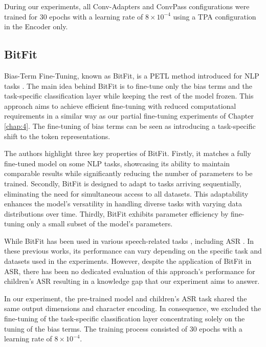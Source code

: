 During our experiments, all Conv-Adapters and ConvPass configurations were trained for 30 epochs with a learning rate of $8 \times 10^{-4}$ using a \ac{TPA} configuration in the Encoder only.


\subsection{BitFit}
Bias-Term Fine-Tuning, known as BitFit, is a \ac{PETL} method introduced for \ac{NLP} tasks \cite{ben-zaken-etal-2022-bitfit}. The main idea behind BitFit is to fine-tune only the bias terms and the task-specific classification layer while keeping the rest of the model frozen. This approach aims to achieve efficient fine-tuning with reduced computational requirements in a similar way as our partial fine-tuning experiments of Chapter \ref{chap:4}. The fine-tuning of bias terms can be seen as introducing a task-specific shift to the token representations.

The authors highlight three key properties of BitFit. Firstly, it matches a fully fine-tuned model on some \ac{NLP} tasks, showcasing its ability to maintain comparable results while significantly reducing the number of parameters to be trained. Secondly, BitFit is designed to adapt to tasks arriving sequentially, eliminating the need for simultaneous access to all datasets. This adaptability enhances the model's versatility in handling diverse tasks with varying data distributions over time. Thirdly, BitFit exhibits parameter efficiency by fine-tuning only a small subset of the model's parameters.

While BitFit has been used in various speech-related tasks \cite{cappellazzo2023parameter,hsieh23_interspeech}, including \ac{ASR} \cite{ng23c_interspeech2}. In these previous works, its performance can vary depending on the specific task and datasets used in the experiments. However, despite the application of BitFit in \ac{ASR}, there has been no dedicated evaluation of this approach's performance for children's \ac{ASR} resulting in a knowledge gap that our experiment aims to answer.


In our experiment, the pre-trained model and children's \ac{ASR} task shared the same output dimensions and character encoding. In consequence, we excluded the fine-tuning of the task-specific classification layer concentrating solely on the tuning of the bias terms. The training process consisted of 30 epochs with a learning rate of $8 \times 10^{-4}$.

